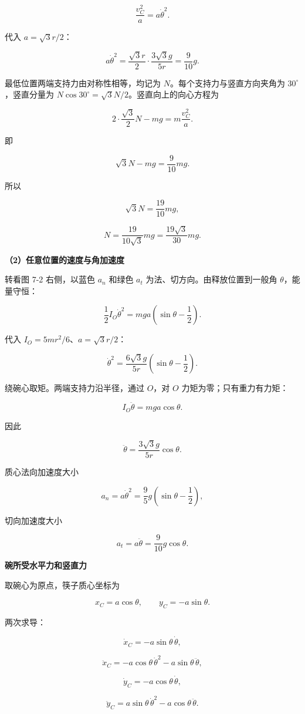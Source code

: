 \documentclass[12pt,a4paper,UTF8]{ctexart}
\begin{document}
\[\frac{v_C^2}{a}=a\dot\theta^2.\]

代入 \(a=\sqrt3r/2\)：

\[a\dot\theta^2
=\frac{\sqrt3r}{2}\cdot\frac{3\sqrt3g}{5r}
=\frac9{10}g.\]

最低位置两端支持力由对称性相等，均记为 \(N\)。每个支持力与竖直方向夹角为
\(30^\circ\)，竖直分量为
\(N\cos30^\circ=\sqrt3N/2\)。竖直向上的向心方程为

\[2\cdot\frac{\sqrt3}{2}N-mg=m\frac{v_C^2}{a}.\]

即

\[\sqrt3N-mg=\frac9{10}mg.\]

所以

\[\sqrt3N=\frac{19}{10}mg,\]

\[\boxed{N=\frac{19}{10\sqrt3}mg=\frac{19\sqrt3}{30}mg}.\]

\textbf{（2）任意位置的速度与角加速度}

转看图 7-2 右侧，以蓝色 \(a_n\) 和绿色 \(a_t\)
为法、切方向。由释放位置到一般角 \(\theta\)，能量守恒：

\[\frac12I_O\dot\theta^2
=mga\left(\sin\theta-\frac12\right).\]

代入 \(I_O=5mr^2/6\)、\(a=\sqrt3r/2\)：

\[\boxed{
\dot\theta^2
=\frac{6\sqrt3g}{5r}\left(\sin\theta-\frac12\right)
}.\]

绕碗心取矩。两端支持力沿半径，通过 \(O\)，对 \(O\)
力矩为零；只有重力有力矩：

\[I_O\ddot\theta=mga\cos\theta.\]

因此

\[\boxed{
\ddot\theta=\frac{3\sqrt3g}{5r}\cos\theta
}.\]

质心法向加速度大小

\[a_n=a\dot\theta^2
=\frac9{5}g\left(\sin\theta-\frac12\right),\]

切向加速度大小

\[a_t=a\ddot\theta
=\frac9{10}g\cos\theta.\]

\textbf{碗所受水平力和竖直力}

取碗心为原点，筷子质心坐标为

\[x_C=a\cos\theta,\qquad y_C=-a\sin\theta.\]

两次求导：

\[\dot x_C=-a\sin\theta\,\dot\theta,\]

\[\ddot x_C=-a\cos\theta\,\dot\theta^2-a\sin\theta\,\ddot\theta,\]

\[\dot y_C=-a\cos\theta\,\dot\theta,\]

\[\ddot y_C=a\sin\theta\,\dot\theta^2-a\cos\theta\,\ddot\theta.\]
\end{document}
